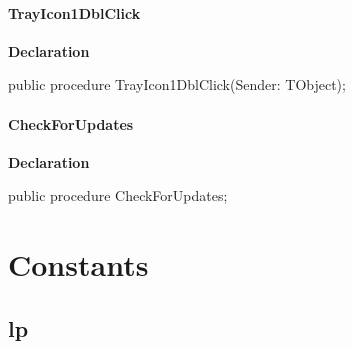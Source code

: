 \documentclass{report}
\newif\ifpdf
\begin{document}
\paragraph*{TrayIcon1DblClick}\hspace*{\fill}

\label{mnupdate.TUMnForm-TrayIcon1DblClick}
\begin{list}{}{
\setlength{\itemindent}{0cm}
\setlength{\listparindent}{0cm}
\setlength{\leftmargin}{\evensidemargin}
\addtolength{\leftmargin}{\tmplength}
\settowidth{\labelsep}{X}
\addtolength{\leftmargin}{\labelsep}
\setlength{\labelwidth}{\tmplength}
}
\item[\textbf{Declaration}\hfill]
\ifpdf
\begin{flushleft}
\fi
\begin{ttfamily}
public procedure TrayIcon1DblClick(Sender: TObject);\end{ttfamily}

\ifpdf
\end{flushleft}
\fi

\end{list}
\paragraph*{CheckForUpdates}\hspace*{\fill}

\label{mnupdate.TUMnForm-CheckForUpdates}
\begin{list}{}{
\setlength{\itemindent}{0cm}
\setlength{\listparindent}{0cm}
\setlength{\leftmargin}{\evensidemargin}
\addtolength{\leftmargin}{\tmplength}
\settowidth{\labelsep}{X}
\addtolength{\leftmargin}{\labelsep}
\setlength{\labelwidth}{\tmplength}
}
\item[\textbf{Declaration}\hfill]
\ifpdf
\begin{flushleft}
\fi
\begin{ttfamily}
public procedure CheckForUpdates;\end{ttfamily}

\ifpdf
\end{flushleft}
\fi

\end{list}
\section{Constants}
\ifpdf
\subsection*{\large{\textbf{lp}}\normalsize\hspace{1ex}\hrulefill}
\else
\end{document}
